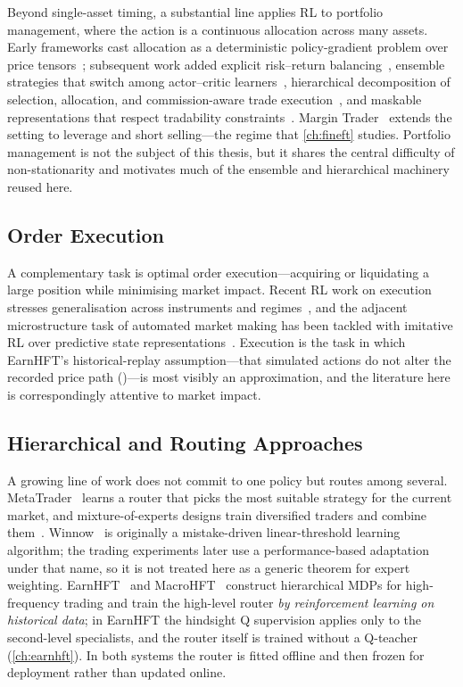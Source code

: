 Beyond single-asset timing, a substantial line applies RL to portfolio management, where the action is a continuous allocation across many assets. Early frameworks cast allocation as a deterministic policy-gradient problem over price tensors~\cite{jiang2017deep,jiang2017cryptocurrency}; subsequent work added explicit risk--return balancing~\cite{wang2021deeptrader}, ensemble strategies that switch among actor--critic learners~\cite{yang2020deep}, hierarchical decomposition of selection, allocation, and commission-aware trade execution~\cite{gao2021framework,zha2022hierarchical,wang2021commission}, and maskable representations that respect tradability constraints~\cite{zhang2024reinforcement}. Margin Trader~\cite{gu2023margin} extends the setting to leverage and short selling---the regime that \cref{ch:fineft} studies. Portfolio management is not the subject of this thesis, but it shares the central difficulty of non-stationarity and motivates much of the ensemble and hierarchical machinery reused here.

\subsection{Order Execution}
\label{sec:bg_execution}

A complementary task is optimal order execution---acquiring or liquidating a large position while minimising market impact. Recent RL work on execution stresses generalisation across instruments and regimes~\cite{zhang2023towards}, and the adjacent microstructure task of automated market making has been tackled with imitative RL over predictive state representations~\cite{niu2023imm}. Execution is the task in which EarnHFT's historical-replay assumption---that simulated actions do not alter the recorded price path ()---is most visibly an approximation, and the literature here is correspondingly attentive to market impact.

\subsection{Hierarchical and Routing Approaches}
\label{sec:bg_routing}

A growing line of work does not commit to one policy but routes among several. MetaTrader~\cite{niu2022metatrader} learns a router that picks the most suitable strategy for the current market, and mixture-of-experts designs train diversified traders and combine them~\cite{sun2023mastering}. Winnow~\cite{littlestone1988winnow} is originally a mistake-driven linear-threshold learning algorithm; the trading experiments later use a performance-based adaptation under that name, so it is not treated here as a generic theorem for expert weighting. EarnHFT~\cite{qin2024earnhft} and MacroHFT~\cite{zong2024macrohft} construct hierarchical MDPs for high-frequency trading and train the high-level router \emph{by reinforcement learning on historical data}; in EarnHFT the hindsight Q supervision applies only to the second-level specialists, and the router itself is trained without a Q-teacher (\cref{ch:earnhft}). In both systems the router is fitted offline and then frozen for deployment rather than updated online.

